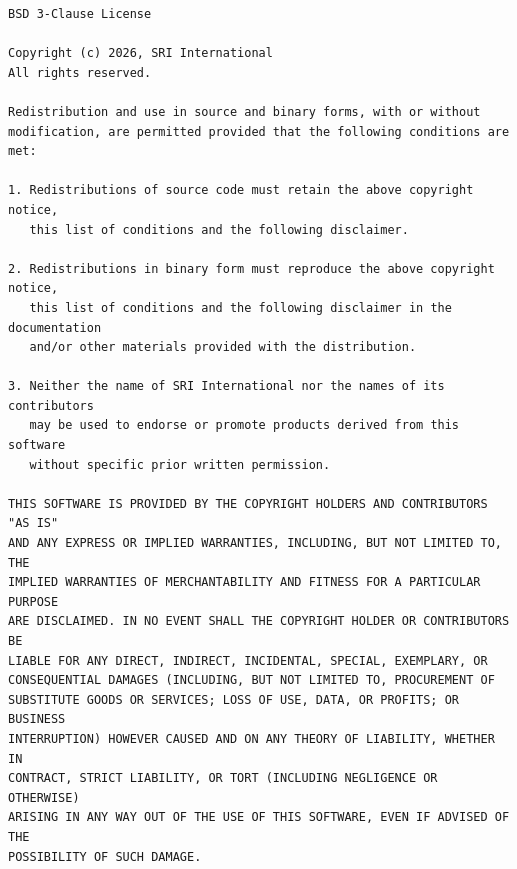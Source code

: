 \documentclass[11pt,twoside,fleqn,openright,titlepage]{cslreport}
\begin{document}
\begin{scriptsize}
\begin{verbatim}
BSD 3-Clause License

Copyright (c) 2026, SRI International
All rights reserved.

Redistribution and use in source and binary forms, with or without
modification, are permitted provided that the following conditions are met:

1. Redistributions of source code must retain the above copyright notice,
   this list of conditions and the following disclaimer.

2. Redistributions in binary form must reproduce the above copyright notice,
   this list of conditions and the following disclaimer in the documentation
   and/or other materials provided with the distribution.

3. Neither the name of SRI International nor the names of its contributors
   may be used to endorse or promote products derived from this software
   without specific prior written permission.

THIS SOFTWARE IS PROVIDED BY THE COPYRIGHT HOLDERS AND CONTRIBUTORS "AS IS"
AND ANY EXPRESS OR IMPLIED WARRANTIES, INCLUDING, BUT NOT LIMITED TO, THE
IMPLIED WARRANTIES OF MERCHANTABILITY AND FITNESS FOR A PARTICULAR PURPOSE
ARE DISCLAIMED. IN NO EVENT SHALL THE COPYRIGHT HOLDER OR CONTRIBUTORS BE
LIABLE FOR ANY DIRECT, INDIRECT, INCIDENTAL, SPECIAL, EXEMPLARY, OR
CONSEQUENTIAL DAMAGES (INCLUDING, BUT NOT LIMITED TO, PROCUREMENT OF
SUBSTITUTE GOODS OR SERVICES; LOSS OF USE, DATA, OR PROFITS; OR BUSINESS
INTERRUPTION) HOWEVER CAUSED AND ON ANY THEORY OF LIABILITY, WHETHER IN
CONTRACT, STRICT LIABILITY, OR TORT (INCLUDING NEGLIGENCE OR OTHERWISE)
ARISING IN ANY WAY OUT OF THE USE OF THIS SOFTWARE, EVEN IF ADVISED OF THE
POSSIBILITY OF SUCH DAMAGE.
\end{verbatim}
\end{scriptsize}
\end{document}
